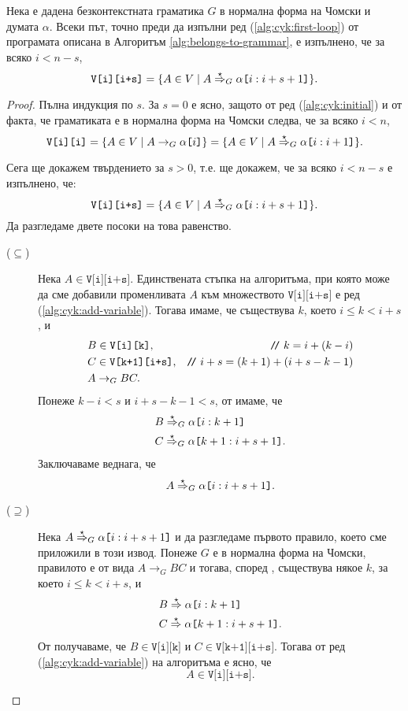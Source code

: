 \begin{lemma}
  Нека е дадена безконтекстната граматика $G$ в нормална форма на Чомски и думата $\alpha$.
  Всеки път, точно преди да изпълни ред (\ref{alg:cyk:first-loop}) от програмата описана в Алгоритъм \ref{alg:belongs-to-grammar},
  е изпълнено, че за всяко $i < n-s$,
  \[\texttt{V[i][i+s]} = \{A \in V \mid A \stackrel{{\star}}{\Rightarrow}_G \alpha\texttt{[}{i:i+s+1}\texttt{]}\}.\]
\end{lemma}
\begin{proof}
  Пълна индукция по $s$.
  За $s = 0$ е ясно, защото от ред (\ref{alg:cyk:initial}) и от факта, че граматиката е в нормална форма на Чомски следва, че за всяко $i < n$, 
  \[\texttt{V[i][i]} = \{A \in V \mid A \to_G \alpha\texttt{[}{i}\texttt{]}\} = \{A \in V \mid A \stackrel{{\star}}{\Rightarrow}_G \alpha\texttt{[}{i:i+1}\texttt{]}\}.\]
  
  Сега ще докажем твърдението за $s > 0$, т.е. ще докажем, че за всяко $i < n-s$ е изпълнено, че:
  \[\texttt{V[i][i+s]} = \{A \in V \mid A \stackrel{{\star}}{\Rightarrow}_G \alpha\texttt{[}{i:i+s+1}\texttt{]}\}.\]
  Да разгледаме двете посоки на това равенство.
  \begin{description}
  \item[($\subseteq$)]
    Нека $A \in \texttt{V[i][i+s]}$.
    Единствената стъпка на алгоритъма, при която може да сме добавили променливата $A$ към множеството $\texttt{V[i][i+s]}$ е ред (\ref{alg:cyk:add-variable}).
    Тогава имаме, че съществува $k$, което $i \leq k < i+s$, и 
    \begin{align*}
      & B \in \texttt{V[i][k]}, & \texttt{/}\!\texttt{/}\  k = i + (k - i)\\
      & C \in \texttt{V[k+1][i+s]}, & \texttt{/}\!\texttt{/}\  i + s = (k+1)+(i+s-k-1)\\
      & A\to_G BC.
    \end{align*}
    Понеже $k-i < s$ и $i + s - k - 1 < s$, от \IndHyp имаме, че
    \begin{align*}
      & B \stackrel{{\star}}{\Rightarrow}_G \alpha\texttt{[}{i:k+1}\texttt{]} \\
      & C \stackrel{{\star}}{\Rightarrow}_G \alpha\texttt{[}{k+1:i+s+1}\texttt{]}. 
    \end{align*}
    Заключаваме веднага, че 
    \[A \stackrel{{\star}}{\Rightarrow}_G \alpha\texttt{[}{i:i+s+1}\texttt{]}.\]
  \item[($\supseteq$)]
    Нека $A \stackrel{{\star}}{\Rightarrow}_G \alpha\texttt{[}{i:i+s+1}\texttt{]}$ и да разгледаме първото правило, което сме приложили в този извод.
    Понеже $G$ е в нормална форма на Чомски, правилото е от вида $A \to_G BC$ и тогава, според , съществува някое $k$, за което $i \leq k < i+s$, и
    \begin{align*}
      & B \stackrel{{\star}}{\Rightarrow} \alpha\texttt{[}{i:k+1}\texttt{]} \\
      & C \stackrel{{\star}}{\Rightarrow} \alpha\texttt{[}{k+1:i+s+1}\texttt{]}.
    \end{align*}
    От \IndHyp получаваме, че $B \in \texttt{V[i][k]}$ и $C \in \texttt{V[k+1][i+s]}$.
    Тогава от ред (\ref{alg:cyk:add-variable}) на алгоритъма е ясно, че 
    \[A \in \texttt{V[i][i+s]}.\]
  \end{description}
\end{proof}


